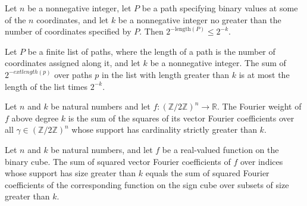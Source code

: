 \begin{theorem}
\leanok
{}
Let $n$ be a nonnegative integer, let $P$ be a path specifying binary values at some of
the $n$ coordinates, and let $k$ be a nonnegative integer no greater than the number of
coordinates specified by $P$. Then $2^{-\mathrm{length}(P)}\le 2^{-k}$.
\end{theorem}

\begin{theorem}
\leanok
{}
Let $P$ be a finite list of paths, where the length of a path is the number of
coordinates assigned along it, and let $k$ be a nonnegative integer. The sum of
$2^{-	ext{length}(p)}$ over paths $p$ in the list with length greater than $k$ is at
most the length of the list times $2^{-k}$.
\end{theorem}

\begin{definition}
\leanok
{}
Let $n$ and $k$ be natural numbers and let $f:(\mathbb{Z}/2\mathbb{Z})^n\to\mathbb{R}$.
The Fourier weight of $f$ above degree $k$ is the sum of the squares of its vector
Fourier coefficients over all $\gamma\in(\mathbb{Z}/2\mathbb{Z})^n$ whose support has
cardinality strictly greater than $k$.
\end{definition}

\begin{theorem}
\leanok
{}
Let $n$ and $k$ be natural numbers, and let $f$ be a real-valued function on the binary
cube. The sum of squared vector Fourier coefficients of $f$ over indices whose support
has size greater than $k$ equals the sum of squared Fourier coefficients of the
corresponding function on the sign cube over subsets of size greater than $k$.
\end{theorem}

